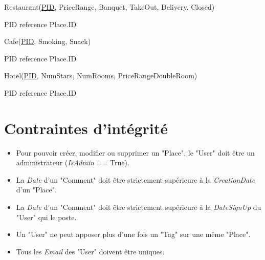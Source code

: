 \documentclass[a4paper,10pt]{article}
\begin{document}
\hspace{-0,5cm}Restaurant(\underline{PID}, PriceRange, Banquet, TakeOut, Delivery, Closed)

PID reference Place.ID

\hspace{-0,5cm}Cafe(\underline{PID}, Smoking, Snack)

PID reference Place.ID

\hspace{-0,5cm}Hotel(\underline{PID}, NumStars, NumRooms, PriceRangeDoubleRoom)

PID reference Place.ID

\section{Contraintes d'intégrité}

\begin{itemize}
  \item Pour pouvoir créer, modifier ou supprimer un "Place", le "User" doit être un administrateur (\emph{IsAdmin} == True).
  \item La \emph{Date} d'un "Comment" doit être strictement supérieure à la \emph{CreationDate} d'un "Place".
  \item La \emph{Date} d'un "Comment" doit être strictement supérieure à la \emph{DateSignUp} du "User" qui le poste.
  \item Un "User" ne peut apposer plus d'une fois un "Tag" sur une même "Place".
  \item Tous les \emph{Email} des "User" doivent être uniques.
\end{itemize}
\end{document}
